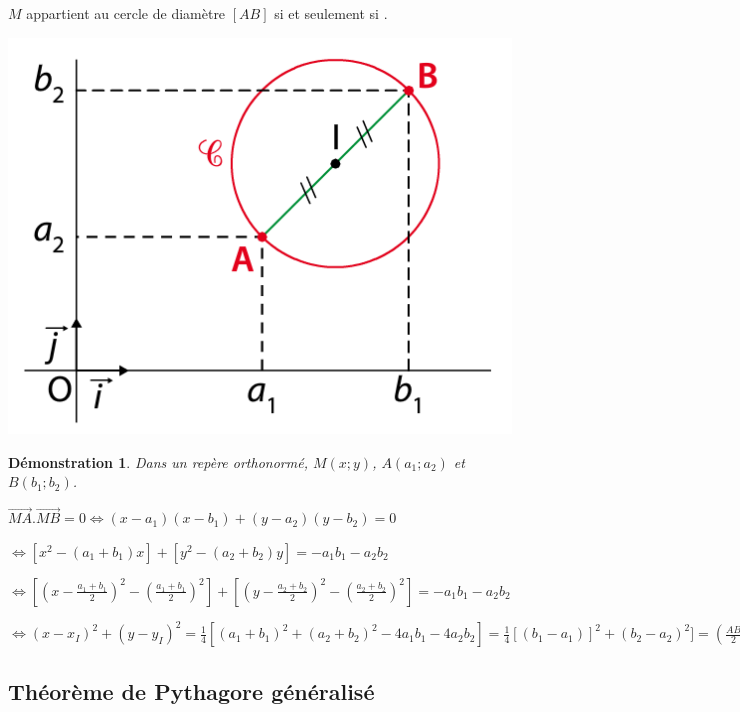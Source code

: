 \documentclass{beamer}
\theoremstyle{plain}
\newtheorem{demonstration}[theorem]{Démonstration}
\begin{document}
\begin{frame}
\begin{theorem}
 $M$ appartient au cercle de diamètre $[AB]$ si et seulement si 
 .
 
      \begin{center}
    \includegraphics[scale=0.5]{../Images/cercleDiametre.png}
  \end{center}
\end{theorem}
\end{frame}
\begin{frame}
\begin{demonstration}
 Dans un repère orthonormé, $M(x;y)$, $A(a_1;a_2)$ et $B(b_1;b_2)$.
 
 $\vec{MA}.\vec{MB}=0 \Leftrightarrow (x-a_1)(x-b_1)+(y-a_2)(y-b_2)=0$
 
 $\Leftrightarrow [x^2-(a_1+b_1)x]+[y^2-(a_2+b_2)y]=-a_1b_1-a_2b_2$
 
 $\Leftrightarrow [(x-\frac{a_1+b_1}{2})^2-(\frac{a_1+b_1}{2})^2]+[(y-\frac{a_2+b_2}{2})^2-(\frac{a_2+b_2}{2})^2]=-a_1b_1-a_2b_2$
 
 $\Leftrightarrow (x-x_I)^2+(y-y_I)^2=\frac{1}{4}[(a_1+b_1)^2+(a_2+b_2)^2-4a_1b_1-4a_2b_2]=\frac{1}{4}[(b_1-a_1)]^2+(b_2-a_2)^2]=(\frac{AB}{2})^2$
\end{demonstration}
\end{frame}

\subsection{Théorème de Pythagore généralisé}
\end{document}
